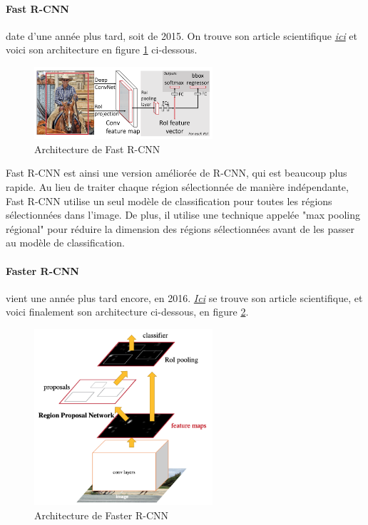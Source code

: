 
\paragraph{Fast R-CNN} date d'une année plus tard, soit de 2015. On trouve son article scientifique \href{https://arxiv.org/pdf/1504.08083.pdf}{\textit{ici}} et voici son architecture en figure \ref{fig:fastRcnn_architecture} ci-dessous.

\begin{figure}[H]
    \centering
    \includegraphics[width=250px]{images/model_fastRcnn_architecture.png}
    \caption{Architecture de Fast R-CNN}
    \label{fig:fastRcnn_architecture}
\end{figure}

Fast R-CNN est ainsi une version améliorée de R-CNN, qui est beaucoup plus rapide. Au lieu de traiter chaque région sélectionnée de manière indépendante, Fast R-CNN utilise un seul modèle de classification pour toutes les régions sélectionnées dans l'image. De plus, il utilise une technique appelée "max pooling régional" pour réduire la dimension des régions sélectionnées avant de les passer au modèle de classification.


\paragraph{Faster R-CNN} vient une année plus tard encore, en 2016.  \href{https://arxiv.org/pdf/1506.01497.pdf}{\textit{Ici}} se trouve son article scientifique, et voici finalement son architecture ci-dessous, en figure \ref{fig:fasterRcnn_architecture}.

\begin{figure}[H]
    \centering
    \includegraphics[width=250px]{images/model_fasterRcnn_architecture.png}
    \caption{Architecture de Faster R-CNN}
    \label{fig:fasterRcnn_architecture}
\end{figure}

